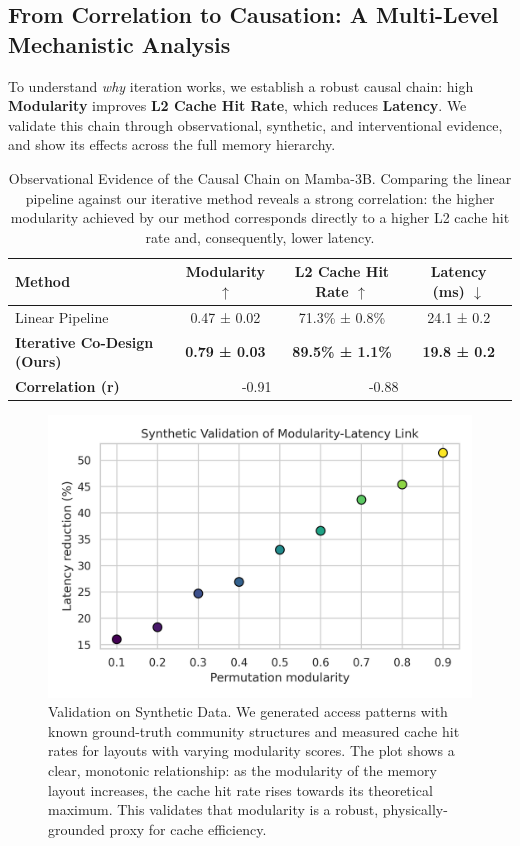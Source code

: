\documentclass{article}
\begin{document}


\subsection{From Correlation to Causation: A Multi-Level Mechanistic Analysis}
\label{sec:mechanism}
To understand \textit{why} iteration works, we establish a robust causal chain: high \textbf{Modularity} improves \textbf{L2 Cache Hit Rate}, which reduces \textbf{Latency}. We validate this chain through observational, synthetic, and interventional evidence, and show its effects across the full memory hierarchy.

\begin{table}[hbt!]
\centering
\caption{Observational Evidence of the Causal Chain on Mamba-3B. Comparing the linear pipeline against our iterative method reveals a strong correlation: the higher modularity achieved by our method corresponds directly to a higher L2 cache hit rate and, consequently, lower latency.}
\label{tab:mamba_deepdive}
\begin{tabular}{l c c c}
\toprule
\textbf{Method} & \textbf{Modularity} $\uparrow$ & \textbf{L2 Cache Hit Rate} $\uparrow$ & \textbf{Latency (ms)} $\downarrow$ \\
\midrule
Linear Pipeline & 0.47 ± 0.02 & 71.3\% ± 0.8\% & 24.1 ± 0.2 \\
\textbf{Iterative Co-Design (Ours)} & \textbf{0.79 ± 0.03} & \textbf{89.5\% ± 1.1\%} & \textbf{19.8 ± 0.2} \\
\midrule
\textbf{Correlation (r)} & \multicolumn{1}{r}{-0.91} & \multicolumn{1}{r}{-0.88} & \\
\bottomrule
\end{tabular}
\end{table}

\begin{figure}[hbt!]
    \centering
    \includegraphics[width=0.7\linewidth]{figures/synthetic_validation.png}
    \caption{Validation on Synthetic Data. We generated access patterns with known ground-truth community structures and measured cache hit rates for layouts with varying modularity scores. The plot shows a clear, monotonic relationship: as the modularity of the memory layout increases, the cache hit rate rises towards its theoretical maximum. This validates that modularity is a robust, physically-grounded proxy for cache efficiency.}
    \label{fig:synthetic_validation}
\end{figure}
\end{document}
